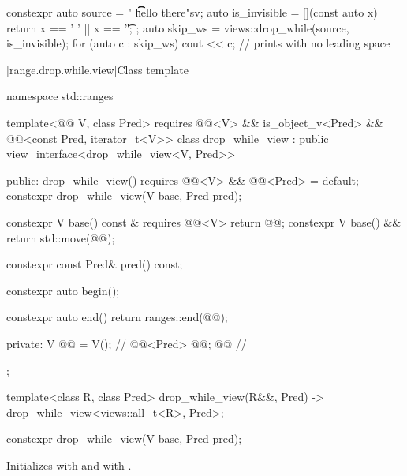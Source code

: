\pnum
\begin{example}
\begin{codeblock}
constexpr auto source = "  \t   \t   \t   hello there"sv;
auto is_invisible = [](const auto x) { return x == ' ' || x == '\t'; };
auto skip_ws = views::drop_while(source, is_invisible);
for (auto c : skip_ws) {
  cout << c;                                    // prints  with no leading space
}
\end{codeblock}
\end{example}

[range.drop.while.view]{Class template }

%
%
%
\begin{codeblock}
namespace std::ranges {
  template<@@ V, class Pred>
    requires @@<V> && is_object_v<Pred> &&
             @@<const Pred, iterator_t<V>>
  class drop_while_view : public view_interface<drop_while_view<V, Pred>> {
  public:
    drop_while_view() requires @@<V> && @@<Pred> = default;
    constexpr drop_while_view(V base, Pred pred);

    constexpr V base() const & requires @@<V> { return @@; }
    constexpr V base() && { return std::move(@@); }

    constexpr const Pred& pred() const;

    constexpr auto begin();

    constexpr auto end() { return ranges::end(@@); }

  private:
    V @@ = V();                                      // \expos
    @@<Pred> @@; @\itcorr[-1]@                           // \expos
  };

  template<class R, class Pred>
    drop_while_view(R&&, Pred) -> drop_while_view<views::all_t<R>, Pred>;
}
\end{codeblock}

%
\begin{itemdecl}
constexpr drop_while_view(V base, Pred pred);
\end{itemdecl}

\begin{itemdescr}
\pnum
\effects
Initializes  with  and
 with .
\end{itemdescr}

